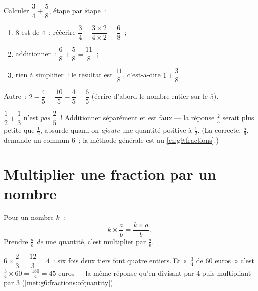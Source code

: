 \begin{example}\label{ex:g7:fractions:add}
Calculer $\dfrac{3}{4} + \dfrac{5}{8}$, étape par étape~:
\begin{enumerate}
  \item $8$ est  de $4$~: réécrire
        $\dfrac34 = \dfrac{3 \times 2}{4 \times 2} = \dfrac{6}{8}$~;
  \item additionner~: $\dfrac{6}{8} + \dfrac{5}{8} = \dfrac{11}{8}$~;
  \item rien à simplifier~: le résultat est $\dfrac{11}{8}$, c'est-à-dire
        $1 + \dfrac38$.
\end{enumerate}
Autre~: $2 - \dfrac{4}{5} = \dfrac{10}{5} - \dfrac{4}{5} =
\dfrac{6}{5}$ (écrire d'abord le nombre entier sur le 
$5$).
\end{example}

\begin{example}\label{ex:g7:fractions:trap}
$\dfrac12 + \dfrac13$ n'est \emph{pas} $\dfrac{2}{5}$~! Additionner
séparément  et  est faux --- la réponse
$\frac25$ serait plus petite que $\frac12$, absurde quand on
\emph{ajoute} une quantité positive à $\frac12$. (La  correcte,
$\frac56$, demande un  commun $6$~; la méthode générale
est au \cref{ch:g9:fractions}.)
\end{example}

\section{Multiplier une fraction par un nombre}

\begin{proposition}\label{prop:g7:fractions:mult}
Pour un nombre $k$~:
\[
k \times \frac{a}{b} = \frac{k \times a}{b} .
\]
Prendre $\frac ab$ \emph{de} une quantité, c'est multiplier par
$\frac ab$.
\end{proposition}
\admitted

\begin{example}\label{ex:g7:fractions:mult}
$6 \times \dfrac{2}{3} = \dfrac{12}{3} = 4$~: six fois deux tiers font
quatre entiers. Et «~$\frac34$ de $60$ euros~» c'est
$\frac34 \times 60 = \frac{180}{4} = 45$ euros --- la même réponse
qu'en divisant par $4$ puis multipliant par $3$
(\cref{met:g6:fractions:ofquantity}).
\end{example}

